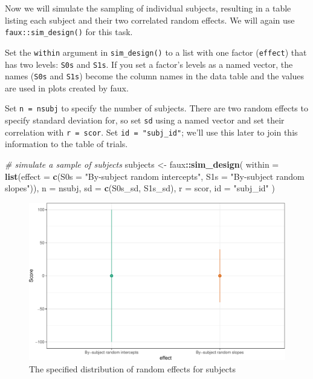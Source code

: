 \documentclass[doc,floatsintext]{apa6}
\newenvironment{Shaded}{\begin{snugshade}}{\end{snugshade}}
\newcommand{\CommentTok}[1]{\textcolor[rgb]{0.56,0.35,0.01}{\textit{#1}}}
\newcommand{\DataTypeTok}[1]{\textcolor[rgb]{0.13,0.29,0.53}{#1}}
\newcommand{\KeywordTok}[1]{\textcolor[rgb]{0.13,0.29,0.53}{\textbf{#1}}}
\newcommand{\NormalTok}[1]{#1}
\newcommand{\OperatorTok}[1]{\textcolor[rgb]{0.81,0.36,0.00}{\textbf{#1}}}
\newcommand{\StringTok}[1]{\textcolor[rgb]{0.31,0.60,0.02}{#1}}
\begin{document}
Now we will simulate the sampling of individual subjects, resulting in a table listing each subject and their two correlated random effects. We will again use \texttt{faux::sim\_design()} for this task.

Set the \texttt{within} argument in \texttt{sim\_design()} to a list with one factor (\texttt{effect}) that has two levels: \texttt{S0s} and \texttt{S1s}. If you set a factor's levels as a named vector, the names (\texttt{S0s} and \texttt{S1s}) become the column names in the data table and the values are used in plots created by faux.

Set \texttt{n\ =\ nsubj} to specify the number of subjects. There are two random effects to specify standard deviation for, so set \texttt{sd} using a named vector and set their correlation with \texttt{r = scor}. Set \texttt{id\ =\ "subj\_id"}; we'll use this later to join this information to the table of trials.

\begin{Shaded}
\begin{Highlighting}[]
\CommentTok{# simulate a sample of subjects}
\NormalTok{subjects <-}\StringTok{ }\NormalTok{faux}\OperatorTok{::}\KeywordTok{sim_design}\NormalTok{(}
  \DataTypeTok{within =} \KeywordTok{list}\NormalTok{(}\DataTypeTok{effect =} \KeywordTok{c}\NormalTok{(}\DataTypeTok{S0s =} \StringTok{"By-subject random intercepts"}\NormalTok{, }
                           \DataTypeTok{S1s =} \StringTok{"By-subject random slopes"}\NormalTok{)), }
  \DataTypeTok{n =}\NormalTok{ nsubj,}
  \DataTypeTok{sd =} \KeywordTok{c}\NormalTok{(S0s_sd, S1s_sd), }
  \DataTypeTok{r =}\NormalTok{ scor,}
  \DataTypeTok{id =} \StringTok{"subj_id"}
\NormalTok{)}
\end{Highlighting}
\end{Shaded}

\begin{figure}

{\centering \includegraphics[width=0.75\linewidth]{images/sim-subjects-1} 

}

\caption{The specified distribution of random effects for subjects}\label{fig:sim-subjects}
\end{figure}
\end{document}
